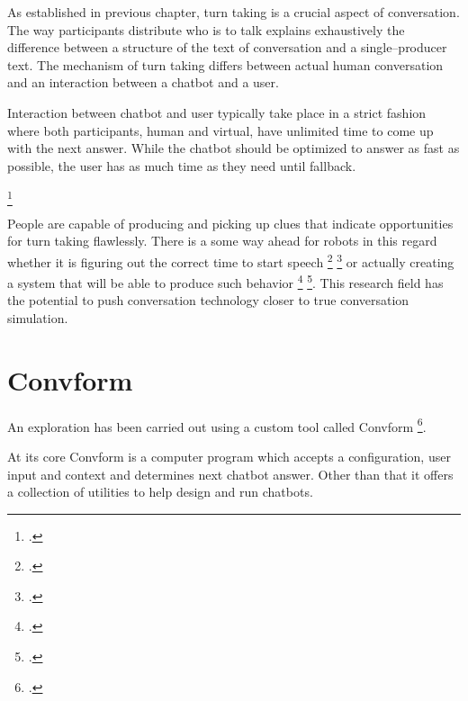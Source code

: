 \documentclass[12pt]{report}
\begin{document}
{\par
As established in previous chapter, turn taking is a crucial aspect of conversation.
The way participants distribute who is to talk
explains exhaustively
the difference between
a structure of the text of conversation
and a single–producer text.
The mechanism of turn taking differs
between actual human conversation
and an interaction between a chatbot and a user.

Interaction between chatbot and user
typically take place in a strict fashion
where both participants,
human and virtual,
have unlimited time to come up with the next answer.
While the chatbot should be optimized to answer as fast as possible,
the user has as much time as they need until fallback.

\par
{} \footcite{turntaking}

\par
People are capable of producing and picking up clues
that indicate opportunities for turn taking flawlessly.
There is a some way ahead for robots in this regard
whether it is figuring out the correct time to start speech \footcite{turntakingreview} \footcite{GRAVANO2011601}
or actually creating a system that will be able to produce such behavior \footcite{distributedturntaking} \footcite{Gervits2020Sigdial}.
This research field
has the potential to push conversation technology
closer to true conversation simulation.

\section{Convform}
\par
An exploration has been carried out using a custom tool called Convform \footcite{convform}.

At its core Convform is a computer program
which accepts a configuration, user input and context
and determines next chatbot answer.
Other than that it offers a collection of utilities
to help design and run chatbots.

}
\end{document}
